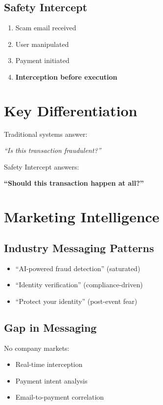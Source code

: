 \documentclass[11pt]{article}
\begin{document}
\subsection{Safety Intercept}
\begin{enumerate}
    \item Scam email received
    \item User manipulated
    \item Payment initiated
    \item \textbf{Interception before execution}
\end{enumerate}

\section{Key Differentiation}

Traditional systems answer:
\begin{center}
\textit{``Is this transaction fraudulent?''}
\end{center}

Safety Intercept answers:
\begin{center}
\textbf{``Should this transaction happen at all?''}
\end{center}

\section{Marketing Intelligence}

\subsection{Industry Messaging Patterns}

\begin{itemize}
    \item ``AI-powered fraud detection'' (saturated)
    \item ``Identity verification'' (compliance-driven)
    \item ``Protect your identity'' (post-event fear)
\end{itemize}

\subsection{Gap in Messaging}

No company markets:
\begin{itemize}
    \item Real-time interception
    \item Payment intent analysis
    \item Email-to-payment correlation
\end{itemize}
\end{document}
